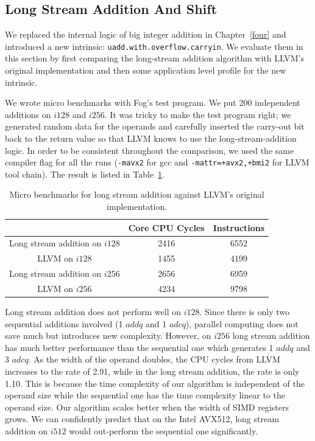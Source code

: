 \subsection{Long Stream Addition And Shift}
We replaced the internal logic of big integer addition in Chapter~\ref{four} and introduced a new intrinsic: {\tt uadd.with.overflow.carryin}. We evaluate them in this section by first comparing the long-stream addition algorithm with LLVM's original implementation and then some application level profile for the new intrinsic.

We wrote micro benchmarks with Fog's test program. We put 200 independent additions on $i128$ and $i256$. It was tricky to make the test program right; we generated random data for the operands and carefully inserted the carry-out bit back to the return value so that LLVM knows to use the long-stream-addition logic. In order to be consistent throughout the comparison, we used the same compiler flag for all the runs ({\tt -mavx2} for gcc and {\tt -mattr=+avx2,+bmi2} for LLVM tool chain). The result is listed in Table~\ref{table:lsadd_micro}.

\begin{table}[h]
\centering
\begin{tabular}{|c|c|c|}
\hline
                             & Core CPU Cycles & Instructions \\ \hline
Long stream addition on $i128$ & 2416            & 6552         \\ \hline
LLVM on $i128$                 & 1455            & 4199         \\ \hline
Long stream addition on $i256$ & 2656            & 6959        \\ \hline
LLVM on $i256$                 & 4234            & 9798         \\ \hline
\end{tabular}
\caption{Micro benchmarks for long stream addition against LLVM's original implementation.}
\label{table:lsadd_micro}
\end{table}

Long stream addition does not perform well on $i128$. Since there is only two sequential additions involved (1 $addq$ and 1 $adcq$), parallel computing does not save much but introduces new complexity. However, on $i256$ long stream addition has much better performance than the sequential one which generates 1 $addq$ and 3 $adcq$. As the width of the operand doubles, the CPU cycles from LLVM increases to the rate of 2.91, while in the long stream addition, the rate is only 1.10. This is because the time complexity of our algorithm is independent of the operand size while the sequential one has the time complexity linear to the operand size. Our algorithm scales better when the width of SIMD registers grows. We can confidently predict that on the Intel AVX512, long stream addition on $i512$ would out-perform the sequential one significantly.

